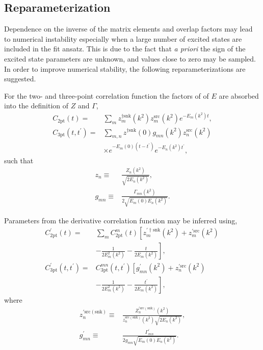 \documentclass[prd,aps,twocolumn,superscriptaddress,tightenlines,nofootinbib,floatfix,preprintnumbers,10pt]{revtex4-1}
\begin{document}
\subsection{Reparameterization}
Dependence on the inverse of the matrix elements and overlap factors may lead to numerical instability especially when a large number of excited states are included in the fit ansatz. This is due to the fact that {\it{a priori}} the sign of the excited state parameters are unknown, and values close to zero may be sampled. In order to improve numerical stability, the following reparameterizations are suggested.

For the two- and three-point correlation function the factors of of $E$ are absorbed into the definition of $Z$ and $\Gamma$,
\begin{align}
C_{\textrm{2pt}}(t) = & \sum_m z^{\dagger\mathrm{snk}}_m(k^2) z^{\mathrm{src}}_m(k^2) e^{-E_m(k^2)t},\\
C_{\textrm{3pt}}(t,t^\prime) = & \sum_{m,n}z^{\dagger\mathrm{snk}}(0)g_{mn}(k^2)z_n^{\mathrm{src}}(k^2)\nonumber \\
&\times e^{-E_m(0)(t-t^\prime)}e^{-E_n(k^2)t^\prime},
\end{align}
such that
\begin{align}
z_n \equiv & \frac{Z_n(k^2)}{\sqrt{2E_n(k^2)}},\\
g_{mn} \equiv & \frac{\Gamma_{mn}(k^2)}{2\sqrt{E_m(0)E_n(k^2)}}.
\end{align}

Parameters from the derivative correlation function may be inferred using,
\begin{align}
C^\prime_{\mathrm{2pt}}(t) = & \sum_m C^m_{\mathrm{2pt}}(t)\left[z^{\prime\dagger\mathrm{snk}}_m(k^2)+z^{\prime\mathrm{src}}_m(k^2)\frac{}{}\right.\nonumber\\
&\left.-\frac{1}{2E_m^2(k^2)}-\frac{t}{2E_m(k^2)}\right],\\
C^\prime_{\mathrm{3pt}}(t,t^\prime)= & C_{\mathrm{3pt}}^{mn}(t,t^\prime)\left[g^\prime_{mn}(k^2)+z^{\prime\mathrm{src}}_n(k^2)\frac{}{}\right.\nonumber\\
&\left.-\frac{1}{2E_m^2(k^2)}-\frac{t^\prime}{2E_m(k^2)}\right],
\end{align}
where
\begin{align}
z^{\prime\mathrm{src(snk)}}_n\equiv & \frac{Z^{\prime\mathrm{src(snk)}}_n(k^2)}{z_n^{\mathrm{src(snk)}}(k^2)\sqrt{2E_n(k^2)}},\\
g^\prime_{mn} \equiv & \frac{\Gamma^\prime_{mn}}{2g_{mn}\sqrt{E_m(0)E_n(k^2)}}.
\end{align}
\end{document}
